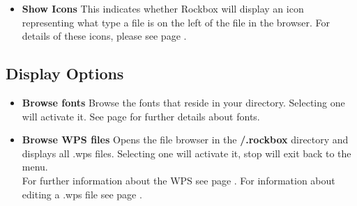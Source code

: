 \begin{itemize}
\begin{itemize}
  \item \textbf{Show Icons}
    This indicates whether Rockbox will display an icon representing what type a file is on the left of the file in the browser.  For details of these icons, please see page \pageref{ref:Supportedfileformats}.
  \end{itemize}
  
  \subsection{\label{ref:Displayoptions}Display Options}
  
  \begin{itemize}
  \item \textbf{Browse fonts}
    Browse the fonts that reside in your  directory. Selecting one will activate it.  See page \pageref{ref:Loadingfonts} for further details about fonts.
    
  \item \textbf{Browse WPS files}
    Opens the file browser in the \textbf{/.rockbox} directory and displays all .wps files. Selecting one will activate it, stop will exit back to the menu.\\
    For further information about the WPS see page \pageref{ref:WPS}. For information  about editing a .wps file see page \pageref{ref:ConfiguringtheWPS}.
    

\end{itemize}
\end{itemize}
